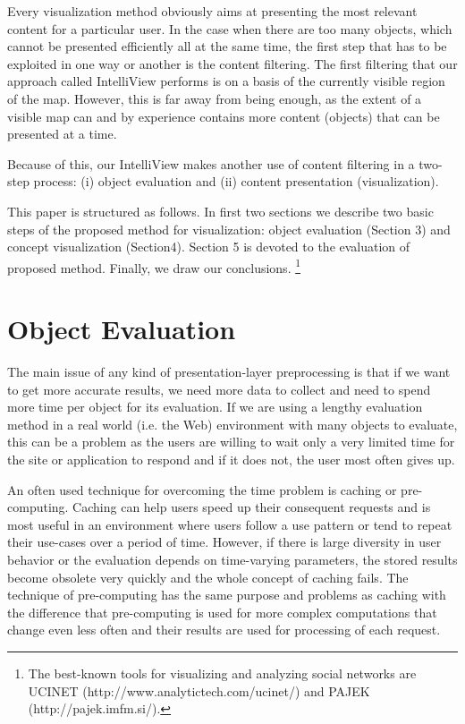 \documentclass{llncs}
\begin{document}
Every visualization method obviously aims at presenting the most relevant content for a particular user. In the case when there are too many objects, which cannot be presented efficiently all at the same time, the first step that has to be exploited in one way or another is the content filtering. The first filtering that our approach called IntelliView performs is on a basis of the currently visible region of the map. However, this is far away from being enough, as the extent of a visible map can and by experience contains more content (objects) that can be presented at a time. 

Because of this, our IntelliView makes another use of content filtering in a two-step process: (i) object evaluation and (ii) content presentation (visualization).

This paper is structured as follows. In first two sections we describe two basic steps of the proposed method for visualization: object evaluation (Section 3) and concept visualization (Section4). Section 5 is devoted to the evaluation of proposed method. Finally, we draw our conclusions.
\footnote{The best-known tools for visualizing and analyzing social networks are UCINET (http://www.analytictech.com/ucinet/) and PAJEK (http://pajek.imfm.si/).}

\section{Object Evaluation}

The main issue of any kind of presentation-layer preprocessing is that if we want to get more accurate results, we need more data to collect and need to spend more time per object for its evaluation. If we are using a lengthy evaluation method in a real world (i.e. the Web) environment with many objects to evaluate, this can be a problem as the users are willing to wait only a very limited time for the site or application to respond and if it does not, the user most often gives up.

An often used technique for overcoming the time problem is caching or pre-computing. Caching can help users speed up their consequent requests and is most useful in an environment where users follow a use pattern or tend to repeat their use-cases over a period of time. However, if there is large diversity in user behavior or the evaluation depends on time-varying parameters, the stored results become obsolete very quickly and the whole concept of caching fails. The technique of pre-computing has the same purpose and problems as caching with the difference that pre-computing is used for more complex computations that change even less often and their results are used for processing of each request.
\end{document}
